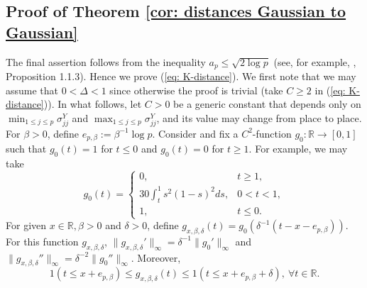 \documentclass[11pt,reqno]{amsart}
\theoremstyle{definition}
\newcommand{\RR}{\mathbb{R}}
\begin{document}
\subsection{Proof of Theorem \ref{cor: distances Gaussian to Gaussian}}
The final assertion follows from the inequality $a_{p} \leq \sqrt{2 \log p}$ (see, for example, \cite{Talagrand2003}, Proposition 1.1.3).
Hence we prove (\ref{eq: K-distance}).
We first note that we may assume that $0 < \Delta < 1$ since otherwise the proof is trivial (take $C \geq 2$ in (\ref{eq: K-distance})).
In what follows, let  $C>0$ be a generic constant that depends only on $\min_{1 \leq j \leq p} \sigma_{jj}^{Y}$ and $\max_{1 \leq j \leq p} \sigma_{jj}^{Y}$, and its value may change from place to place.
For $\beta > 0$, define $e_{p,\beta} := \beta^{-1} \log p$.
Consider and fix a $C^{2}$-function $g_0:\RR \to [0,1]$ such that $g_0(t)=1$ for $t \leq 0$ and $g_0(t)=0$ for $t \geq 1$. For example, we may take
\begin{equation*}
g_{0}(t) =
\begin{cases}
0, & t \geq 1, \\
30\int_{t}^{1} s^{2}(1-s)^{2} ds, & 0 < t < 1, \\
1, & t \leq 0.
\end{cases}
\end{equation*}
For given $x \in \RR, \beta > 0$ and $\delta > 0$,  define $g_{x,\beta,\delta} (t)=g_0(\delta^{-1}(t-x-e_{p,\beta}))$.  For this function $g_{x,\beta,\delta}$, $\| g_{x,\beta,\delta}' \|_{\infty} = \delta^{-1} \| g_{0}' \|_{\infty}$ and $\| g_{x,\beta,\delta}'' \|_{\infty} = \delta^{-2} \| g_{0}'' \|_{\infty}$. Moreover,
\begin{equation}
1(t \leq x+e_{p,\beta}) \leq g_{x,\beta,\delta}(t) \leq 1(t \leq x + e_{p,\beta} + \delta), \ \forall t \in \RR. \label{eq: property of g}
\end{equation}
\end{document}
